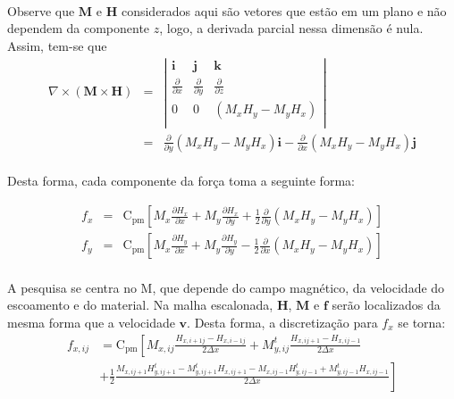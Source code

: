 \documentclass[eletromagnetismo.tex]{subfiles}
\begin{document}
\paragraph{} Observe que $\mathbf{M}$ e $\mathbf{H}$ considerados aqui são vetores que estão em um plano e não dependem da componente $z$, logo, a derivada parcial nessa dimensão é nula. Assim, tem-se que \begin{eqnarray}
	\nabla\times(\mathbf{M}\times \mathbf{H}) & = & \left|\begin{array}{ccc}
\mathbf{i} & \mathbf{j} & \mathbf{k}\\
\frac{\partial}{\partial x} & \frac{\partial}{\partial y} & \frac{\partial}{\partial z}\\
0 & 0 & (M_x H_y - M_y H_x)\\	
\end{array}
\right| \nonumber \\
&=& \frac{\partial}{\partial y}(M_x H_y - M_y H_x)\mathbf{i} - \frac{\partial}{\partial x}(M_x H_y - M_y H_x)\mathbf{j}
\end{eqnarray}

\paragraph{} Desta forma, cada componente da força toma a seguinte forma:

\begin{eqnarray}
f_x & = & \mathrm{C}_{\mathrm{pm}}\left[M_x \frac{\partial H_x}{\partial x}+M_y \frac{\partial H_x}{\partial y}+\frac{1}{2}\frac{\partial}{\partial y}(M_x H_y - M_y H_x)\right]\\
f_y & = & \mathrm{C}_{\mathrm{pm}}\left[M_x \frac{\partial H_y}{\partial x}+M_y \frac{\partial H_y}{\partial y}-\frac{1}{2}\frac{\partial}{\partial x}(M_x H_y - M_y H_x)\right]
\end{eqnarray}

\paragraph{} A pesquisa se centra no $\mathrm{M}$, que depende do campo magnético, da velocidade do escoamento e do material. Na malha escalonada, $\mathbf{H}$, $\mathbf{M}$ e $\mathbf{f}$ serão localizados da mesma forma que a velocidade $\mathbf{v}$. Desta forma, a discretização para $f_x$ se torna: \begin{align}
f_{x,ij} & = \mathrm{C}_{\mathrm{pm}}\left[M_{x,ij} \frac{H_{x,i+1j} - H_{x,i-1j}}{2\Delta x}+M_{y,ij}^t \frac{H_{x,ij+1} - H_{x,ij-1}}{2\Delta x} \right. \nonumber \\
&+\left. \frac{1}{2}\frac{M_{x,ij+1} H_{y,ij+1}^t - M_{y,ij+1}^t H_{x,ij+1} - M_{x,ij-1} H_{y,ij-1}^t + M_{y,ij-1}^t H_{x,ij-1}}{2\Delta x}\right]
\end{align}
\end{document}
